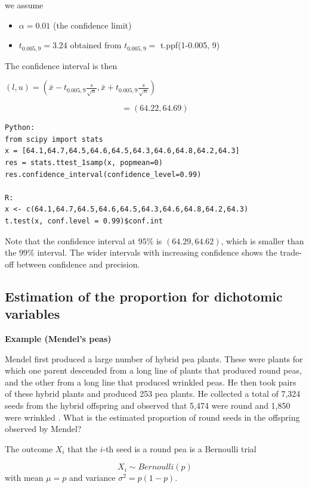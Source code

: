 \documentclass[
]{book}
\providecommand{\tightlist}{%
  \setlength{\itemsep}{0pt}\setlength{\parskip}{0pt}}
\begin{document}
we assume

\begin{itemize}
\tightlist
\item
  \(\alpha=0.01\) (the confidence limit)
\item
  \(t_{0.005,9}=3.24\) obtained from \(t_{0.005,9}=\) t.ppf(1-0.005, 9)
\end{itemize}

The confidence interval is then

\((l,u)=(\bar{x}- t_{0.005,9}\frac{s}{\sqrt{n}},\bar{x}+t_{0.005,9} \frac{s}{\sqrt{n}})\)

\[=(64.22, 64.69)\]

\begin{verbatim}
Python:
from scipy import stats
x = [64.1,64.7,64.5,64.6,64.5,64.3,64.6,64.8,64.2,64.3]
res = stats.ttest_1samp(x, popmean=0)
res.confidence_interval(confidence_level=0.99)

R:
x <- c(64.1,64.7,64.5,64.6,64.5,64.3,64.6,64.8,64.2,64.3)
t.test(x, conf.level = 0.99)$conf.int
\end{verbatim}

Note that the confidence interval at \(95\%\) is \((64.29, 64.62)\), which is smaller than the \(99\%\) interval. The wider intervals with increasing confidence shows the trade-off between confidence and precision.

\hypertarget{estimation-of-the-proportion-for-dichotomic-variables}{%
\subsection{Estimation of the proportion for dichotomic variables}\label{estimation-of-the-proportion-for-dichotomic-variables}}

\textbf{Example (Mendel's peas)}

Mendel first produced a large number of hybrid pea plants. These were plants for which one parent descended from a long line of plants that produced round peas, and the other from a long line that produced wrinkled peas. He then took pairs of these hybrid plants and produced 253 pea plants. He collected a total of 7,324 seeds from the hybrid offspring and observed that 5,474 were round and 1,850 were wrinkled \citep{mendel1901experiments}. What is the estimated proportion of round seeds in the offspring observed by Mendel?

The outcome \(X_i\) that the \(i\)-th seed is a round pea is a Bernoulli trial

\[X_i \sim Bernoulli(p)\]
with mean \(\mu=p\) and variance \(\sigma^2=p(1-p)\).
\end{document}
